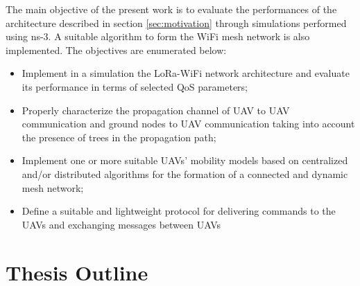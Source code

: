 The main objective of the present work is to evaluate the performances of the architecture described in section \ref{sec:motivation} through simulations performed using \gls{ns-3}. A suitable algorithm to form the WiFi mesh network is also implemented.
The objectives are enumerated below:
\begin{itemize}
	\item Implement in a simulation the LoRa-WiFi network architecture and evaluate its performance in terms of selected QoS parameters;
	\item Properly characterize the propagation channel of \gls{UAV} to \gls{UAV} communication and ground nodes to \gls{UAV} communication taking into account the presence of trees in the propagation path; 
	\item  Implement one or more suitable \glspl{UAV}' mobility models based on centralized and/or distributed algorithms for the formation of a connected and dynamic mesh network;
	\item Define a suitable and lightweight protocol for delivering commands to the \glspl{UAV} and exchanging messages between \glspl{UAV}  
\end{itemize}

\section{Thesis Outline}




%
%
%
%
